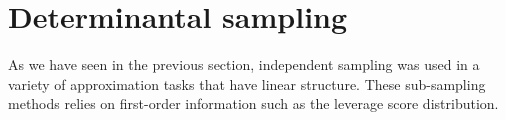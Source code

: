 \documentclass[twoside,11pt]{book}
\newtheorem{definition}{Definition}
\numberwithin{theorem}{chapter}
\numberwithin{definition}{chapter}
\numberwithin{proposition}{chapter}
\numberwithin{corollary}{chapter}
\numberwithin{example}{chapter}
\numberwithin{lemma}{chapter}
\numberwithin{assumption}{chapter}
\numberwithin{equation}{chapter}
\numberwithin{figure}{chapter}
\DeclareMathOperator{\Det}{Det}
\DeclareMathOperator{\EX}{\mathbb{E}}
\DeclareMathOperator{\Prb}{\mathbb{P}}
\DeclareMathOperator{\X}{\mathcal{X}}
\begin{document}






\section{Determinantal sampling}
As we have seen in the previous section, independent sampling was used in a variety of approximation tasks that have linear structure. These sub-sampling methods relies on first-order information such as the leverage score distribution. 
\end{document}
